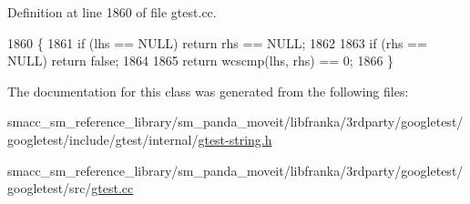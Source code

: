 Definition at line 1860 of file gtest.\+cc.


\begin{DoxyCode}
1860                                                                        \{
1861   \textcolor{keywordflow}{if} (lhs == NULL) \textcolor{keywordflow}{return} rhs == NULL;
1862 
1863   \textcolor{keywordflow}{if} (rhs == NULL) \textcolor{keywordflow}{return} \textcolor{keyword}{false};
1864 
1865   \textcolor{keywordflow}{return} wcscmp(lhs, rhs) == 0;
1866 \}
\end{DoxyCode}


The documentation for this class was generated from the following files\+:\begin{DoxyCompactItemize}
\item 
smacc\+\_\+sm\+\_\+reference\+\_\+library/sm\+\_\+panda\+\_\+moveit/libfranka/3rdparty/googletest/googletest/include/gtest/internal/\hyperlink{gtest-string_8h}{gtest-\/string.\+h}\item 
smacc\+\_\+sm\+\_\+reference\+\_\+library/sm\+\_\+panda\+\_\+moveit/libfranka/3rdparty/googletest/googletest/src/\hyperlink{gtest_8cc}{gtest.\+cc}\end{DoxyCompactItemize}
